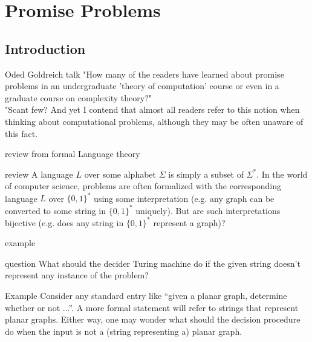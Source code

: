\section{Promise Problems}
    \subsection{Introduction}
        \begin{frame}{Oded Goldreich talk}
            "How many of the readers have learned about promise problems in an undergraduate 'theory of computation' course or even in a graduate course on complexity theory?"\\
            \pause 
            "Scant few? And yet I contend that almost all readers refer to this notion when thinking about computational problems, although they may be often unaware of this fact.
        \end{frame}
        
        \begin{frame}{review from formal Language theory}
            \begin{block}{review}
                A language $L$ over some alphabet $\Sigma$ is simply a subset of $\Sigma^*$. In the world of computer science, problems are often formalized with the corresponding language $L$ over $\{0,1\}^*$ using some interpretation (e.g. any graph can be converted to some string in $\{0,1\}^*$ uniquely). But are such interpretations bijective (e.g. does any string in $\{0,1\}^*$ represent a graph)?
            \end{block}
        \end{frame}
    
        \begin{frame}{example}
            \begin{alertblock}{question}
                What should the decider Turing machine do if the given string doesn't represent any instance of the problem? 
            \end{alertblock}
            \pause
            \begin{exampleblock}{Example}
                Consider any standard entry like “given a planar graph, determine whether or not ...”. A more formal statement will refer to strings that represent planar graphs. Either way, one may wonder what should the decision procedure do when the input is not a (string representing a) planar graph.
            \end{exampleblock}
        \end{frame}
        
